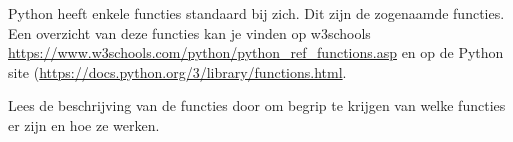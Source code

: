 Python heeft enkele functies standaard bij zich. Dit zijn de zogenaamde  functies. Een overzicht van deze functies kan je vinden op w3schools \url{https://www.w3schools.com/python/python_ref_functions.asp} en op de Python site (\url{https://docs.python.org/3/library/functions.html}.

Lees de beschrijving van de functies door om begrip te krijgen van welke functies er zijn en hoe ze werken.


